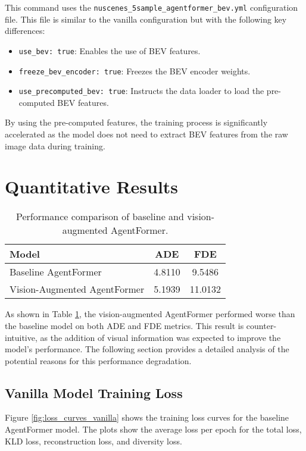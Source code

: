 This command uses the \texttt{nuscenes\_5sample\_agentformer\_bev.yml} configuration file. This file is similar to the vanilla configuration but with the following key differences:

\begin{itemize}
    \item \texttt{use\_bev: true}: Enables the use of BEV features.
    \item \texttt{freeze\_bev\_encoder: true}: Freezes the BEV encoder weights.
    \item \texttt{use\_precomputed\_bev: true}: Instructs the data loader to load the pre-computed BEV features.
\end{itemize}

By using the pre-computed features, the training process is significantly accelerated as the model does not need to extract BEV features from the raw image data during training.

\section{Quantitative Results}

\begin{table}[h]
\centering
\caption{Performance comparison of baseline and vision-augmented AgentFormer.}
\label{tab:results}
\begin{tabular}{lcc}
\toprule
\textbf{Model} & \textbf{ADE} & \textbf{FDE} \\
\midrule
Baseline AgentFormer & 4.8110 & 9.5486 \\
Vision-Augmented AgentFormer & 5.1939 & 11.0132 \\
\bottomrule
\end{tabular}
\end{table}

As shown in Table \ref{tab:results}, the vision-augmented AgentFormer performed worse than the baseline model on both ADE and FDE metrics. This result is counter-intuitive, as the addition of visual information was expected to improve the model's performance. The following section provides a detailed analysis of the potential reasons for this performance degradation.

\subsection{Vanilla Model Training Loss}

Figure \ref{fig:loss_curves_vanilla} shows the training loss curves for the baseline AgentFormer model. The plots show the average loss per epoch for the total loss, KLD loss, reconstruction loss, and diversity loss.

